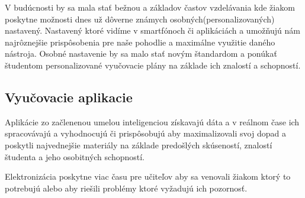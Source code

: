 \documentclass[10pt,oneside,slovak,a4paper]{article}
\begin{document}
V budúcnosti by sa mala stať bežnou a základov častov vzdelávania kde žiakom poskytne možnosti dnes už dôverne známych osobných(personalizovaných) nastavený. Nastavený ktoré vidíme v smartfónoch či aplikáciách a umožňujú nám najrôznejšie prispôsobenia pre naše pohodlie a maximálne využitie daného nástroja. Osobné nastavenie by sa malo stať novým štandardom a ponúkať študentom personalizované vyučovacie plány na základe ich znalostí a schopností.


\subsection{Vyučovacie aplikacie}

Aplikácie zo začlenenou umelou inteligenciou získavajú dáta a v reálnom čase ich spracovávajú a vyhodnocujú či prispôsobujú aby maximalizovali svoj dopad a poskytli najvednejšie materiály na základe predošlých skúseností, znalostí študenta a jeho osobitných schopností.

Elektronizácia poskytne viac času pre učiteľov aby sa venovali žiakom ktorý to potrebujú alebo aby riešili problémy ktoré vyžadujú ich pozornosť.  
\end{document}
